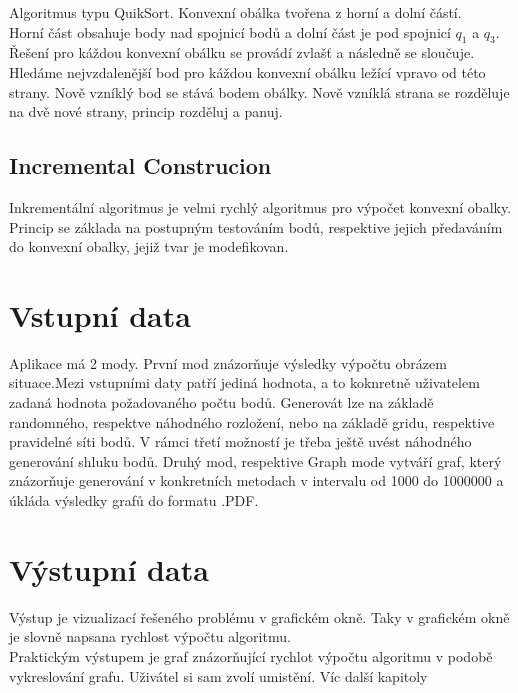 \documentclass{article}
\begin{document}
Algoritmus typu QuikSort. Konvexní obálka tvořena z horní a dolní částí.\\
Horní část obsahuje body nad spojnicí bodů a dolní část je pod spojnicí $q_1$ a $q_3$.\\
Řešení pro káždou konvexní obálku se provádí zvlašť a následně se sloučuje. Hledáme nejvzdalenější bod pro káždou konvexní obálku ležící vpravo od této strany. Nově vzníklý bod se stává bodem obálky. Nově vzníklá strana se rozděluje na dvě nové strany, princip rozděluj a panuj.\\
\bigskip
\subsection{Incremental Construcion}

Inkrementální algoritmus je velmi rychlý algoritmus pro výpočet konvexní obalky. Princip se základa na postupným testováním bodů, respektive jejich předaváním do konvexní obalky, jejiž tvar je modefikovan.\\
\bigskip
\clearpage
\newpage
\section{Vstupní data}
Aplikace má 2 mody.  První mod znázorňuje výsledky výpočtu obrázem situace.Mezi vstupními daty patří jediná hodnota, a to koknretně uživatelem zadaná hodnota požadovaného počtu bodů. Generovát lze na základě randomného, respektve náhodného rozložení, nebo na základě gridu, respektive pravidelné síti bodů. V rámci třetí možností je třeba ještě uvést náhodného generování shluku bodů.
\bigskip
Druhý mod, respektive Graph mode vytváří graf, který znázorňuje generování v konkretních metodach v intervalu od 1000 do 1000000 a úkláda výsledky grafů do formatu .PDF.
\bigskip
\clearpage
\newpage
\section{Výstupní data}
Výstup je vizualizací řešeného problému v grafickém okně. Taky v grafickém okně je slovně napsana rychlost výpočtu algoritmu.\\ 
\bigskip 
Praktickým výstupem je graf znázorňující rychlot výpočtu algoritmu v podobě vykreslování grafu. Uživátel si sam zvolí umistění. Víc další kapitoly\\ 
\bigskip 
\clearpage
\end{document}
